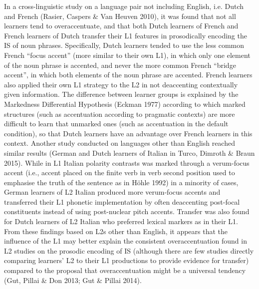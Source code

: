 \begin{styleStandard}
In a cross-linguistic study on a language pair not including English, i.e. Dutch and French (Rasier, Caspers \& Van Heuven 2010), it was found that not all learners tend to overaccentuate, and that both Dutch learners of French and French learners of Dutch transfer their L1 features in prosodically encoding the IS of noun phrases. Specifically, Dutch learners tended to use the less common French “focus accent” (more similar to their own L1), in which only one element of the noun phrase is accented, and never the more common French “bridge accent”, in which both elements of the noun phrase are accented. French learners also applied their own L1 strategy to the L2 in not deaccenting contextually given information. The difference between learner groups is explained by the Markedness Differential Hypothesis (Eckman 1977) according to which marked structures (such as accentuation according to pragmatic contexts) are more difficult to learn that unmarked ones (such as accentuation in the default condition), so that Dutch learners have an advantage over French learners in this context. Another study conducted on languages other than English reached similar results (German and Dutch learners of Italian in Turco, Dimroth \& Braun 2015). While in L1 Italian polarity contrasts was marked through a verum-focus accent (i.e., accent placed on the finite verb in verb second position used to emphasise the truth of the sentence as in Höhle 1992) in a minority of cases, German learners of L2 Italian produced more verum-focus accents and transferred their L1 phonetic implementation by often deaccenting post-focal constituents instead of using post-nuclear pitch accents. Transfer was also found for Dutch learners of L2 Italian who preferred lexical markers as in their L1. From these findings based on L2s other than English, it appears that the influence of the L1 may better explain the consistent overaccentuation found in L2 studies on the prosodic encoding of IS (although there are few studies directly comparing learners’ L2 to their L1 productions to provide evidence for transfer) compared to the proposal that overaccentuation might be a universal tendency (Gut, Pillai \& Don 2013; Gut \& Pillai 2014).
\end{styleStandard}

